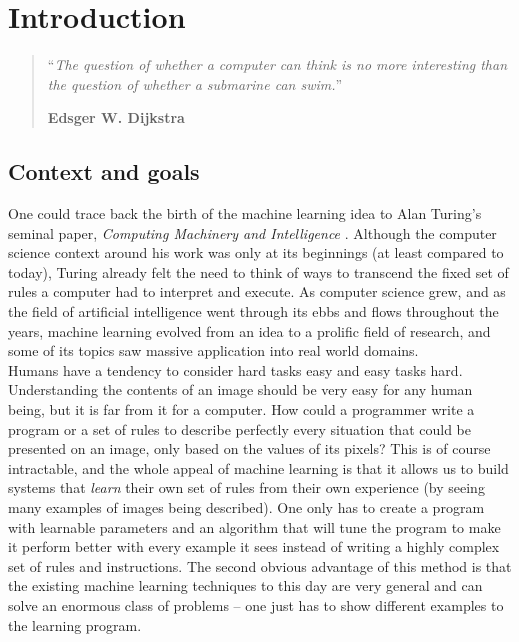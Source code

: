 \chapter{Introduction}
\setcounter{page}{1}
\begin{quotation}
\noindent ``\emph{The question of whether a computer can think is no more 
	interesting than the question of whether a submarine can swim.}''
\begin{flushright}\textbf{Edsger W. Dijkstra}\end{flushright}
\end{quotation}

\vspace*{0.5cm}

\section{Context and goals}
One could trace back the birth of the machine learning idea to Alan Turing's 
seminal paper, \textit{Computing Machinery and Intelligence} 
\cite{turing1950computing}. Although the computer science context around his
work was only at its beginnings (at least compared to today), Turing already felt
the need to think of ways to transcend the fixed set of rules a computer had
to interpret and execute. As computer science grew, and as the field of
artificial intelligence went through its ebbs and flows throughout the years,
machine learning evolved from an idea to a prolific field of research, and
some of its topics saw massive application into real world domains.\\

Humans have a tendency to consider hard tasks easy and easy tasks hard.
Understanding the contents of an image should be very easy for any human
being, but it is far from it for a computer. How could a programmer write
a program or a set of rules to describe perfectly every situation that could
be presented on an image, only based on the values of its pixels? This is
of course intractable, and the whole appeal of machine learning is that it
allows us to build systems that \textit{learn} their own set of rules from
their own experience (by seeing many examples of images being
described). One only has to create a program with learnable parameters and an
algorithm that will tune the program to make it perform better with every
example it sees instead of writing a highly complex set of rules and 
instructions. The second obvious advantage of this method is that the existing
machine learning techniques to this day are very general and can solve an
enormous class of problems -- one just has to show different examples to the
learning program.\\

